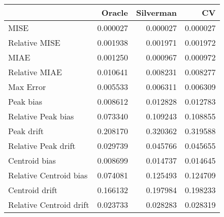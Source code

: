 \begin{tabular}{lrrr}
  \hline
 & Oracle & Silverman & CV \\ 
  \hline
MISE & 0.000027 & 0.000027 & 0.000027 \\ 
  Relative MISE & 0.001938 & 0.001971 & 0.001972 \\ 
  MIAE & 0.001250 & 0.000967 & 0.000972 \\ 
  Relative MIAE & 0.010641 & 0.008231 & 0.008277 \\ 
  Max Error & 0.005533 & 0.006311 & 0.006309 \\ 
  Peak bias & 0.008612 & 0.012828 & 0.012783 \\ 
  Relative Peak bias & 0.073340 & 0.109243 & 0.108855 \\ 
  Peak drift & 0.208170 & 0.320362 & 0.319588 \\ 
  Relative Peak drift & 0.029739 & 0.045766 & 0.045655 \\ 
  Centroid bias & 0.008699 & 0.014737 & 0.014645 \\ 
  Relative Centroid bias & 0.074081 & 0.125493 & 0.124709 \\ 
  Centroid drift & 0.166132 & 0.197984 & 0.198233 \\ 
  Relative Centroid drift & 0.023733 & 0.028283 & 0.028319 \\ 
   \hline
\end{tabular}
